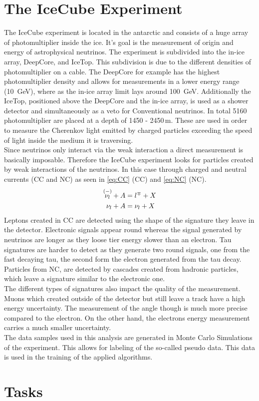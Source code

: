 \section{The IceCube Experiment}
\label{sec:The_IceCube_Experiment}
The IceCube experiment is located in the antarctic and consists of a huge array of photomultiplier inside the ice. 
It's goal is the measurement of origin and energy of astrophysical neutrinos.
The experiment is subdivided into the in-ice array, DeepCore, and IceTop. 
This subdivision is due to the different densities of photomultiplier on a cable. 
The DeepCore for example has the highest photomultiplier density and allows for measurements in a lower energy 
range (\qty{10}{\giga\eV}), where as the in-ice array limit lays around \qty{100}{\giga\eV}.
Additionally the IceTop, positioned above the DeepCore and the in-ice array, 
is used as a shower detector and simultaneously as a veto for Conventional neutrinos.
In total 5160 photomultiplier are placed at a depth of 1450 - 2450\,\unit{\meter}. 
These are used in order to measure the Cherenkov light emitted by charged particles exceeding the speed of light inside the medium it is traversing. \\

Since neutrinos only interact via the weak interaction a direct measurement is basically imposable. 
Therefore the IceCube experiment looks for particles created by weak interactions of the neutrinos. 
In this case through charged and neutral currents (CC and NC) as seen in \autoref{eq:CC} (CC) and \autoref{eq:NC} (NC).
\begin{align}
	\overset{(-)}{\nu_l} + A &= l^\mp + X \label{eq:CC}\\
	\nu_l + A &= \nu_l + X \label{eq:NC}	
\end{align}
Leptons created in CC are detected using the shape of the signature they leave in the detector. 
Electronic signals appear round whereas the signal generated by neutrinos 
are longer as they loose tier energy slower than an electron. 
Tau signatures are harder to detect as they generate two round signals, 
one from the fast decaying tau, the second form the electron generated from the tau decay.
Particles from NC, are detected by cascades created from hadronic particles, 
which leave a signature similar to the electronic one.\\

The different types of signatures also impact the quality of the measurement. Muons which created outside of the detector but still leave a track have a high energy uncertainty. The measurement of the angle though is much more precise compared to the electron. On the other hand, the electrons energy measurement carries a much smaller uncertainty.\\

The data samples used in this analysis are generated in Monte Carlo Simulations of the experiment. This allows for labeling of the so-called pseudo data. This data is used in the training of the applied algorithms.

\section{Tasks}
\label{sec:Tasks}

